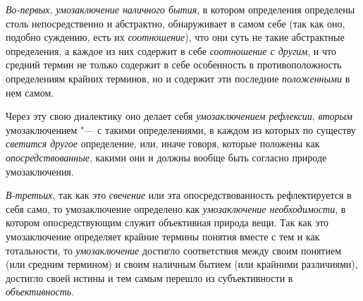 {{{\em Во-первых},
{\em умозаключение наличного бытия},
в котором определения определены столь непосредственно и
абстрактно, обнаруживает в самом себе (так как оно, подобно суждению, есть
их {\em соотношение}),
что они суть не такие абстрактные определения, а каждое из
них содержит в себе {\em соотношение с
другим}, и что средний термин не только содержит в себе
особенность в противоположность определениям крайних терминов, но и
содержит эти последние
{\em положенными} в нем
самом.

Через эту свою диалектику оно делает себя
{\em умозаключением рефлексии},
{\em вторым}
умозаключением "--- с такими определениями, в
каждом из которых по существу
{\em светится другое}
определение, или, иначе говоря, которые положены как
{\em опосредствованные},
какими они и должны вообще быть согласно природе
умозаключения.

{\em В-третьих}, так как
это {\em свечение} или
эта опосредствованность рефлектируется в себя само, то умозаключение
определено как {\em умозаключение
необходимости}, в котором опосредствующим служит объективная
природа вещи. Так как это умозаключение определяет крайние термины понятия
вместе с тем и как тотальности, то
{\em умозаключение}
достигло соответствия между своим понятием (или средним
термином) и своим наличным бытием (или крайними различиями), достигло своей
истины и тем самым перешло из субъективности в
{\em объективность}.

}}
